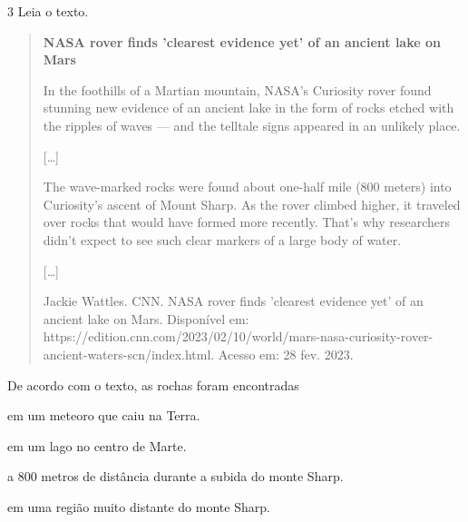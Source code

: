 
\num{3} Leia o texto.

\begin{quote}
\textbf{NASA rover finds 'clearest evidence yet' of an ancient lake on Mars}

In the foothills of a Martian mountain, NASA's Curiosity rover found
stunning new evidence of an ancient lake in the form of rocks etched
with the ripples of waves --- and the telltale signs appeared in an
unlikely place.

{[}\ldots{}{]}

The wave-marked rocks were found about one-half mile (800 meters) into
Curiosity's ascent of Mount Sharp. As the rover climbed higher, it
traveled over rocks that would have formed more recently. That's why
researchers didn't expect to see such clear markers of a large body of
water.

{[}\ldots{}{]}

Jackie Wattles. CNN. NASA rover finds 'clearest evidence yet' of an
ancient lake on Mars. Disponível em:
https://edition.cnn.com/2023/02/10/world/mars-nasa-curiosity-rover-ancient-waters-scn/index.html.
Acesso em: 28 fev. 2023.
\end{quote}


De acordo com o texto, as rochas foram encontradas

\begin{escolha}
\item em um meteoro que caiu na Terra.

\item em um lago no centro de Marte.

\item a 800 metros de distância durante a subida do monte Sharp.

\item em uma região muito distante do monte Sharp.
\end{escolha}

